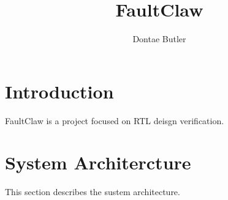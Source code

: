\documentclass{article}
\title{FaultClaw}
\author{Dontae Butler}
\begin{document}
\maketitle

\section{Introduction}

FaultClaw is a project focused on RTL deisgn verification.

\section{System Architercture}

This section describes the sustem architecture.
\end{document}
